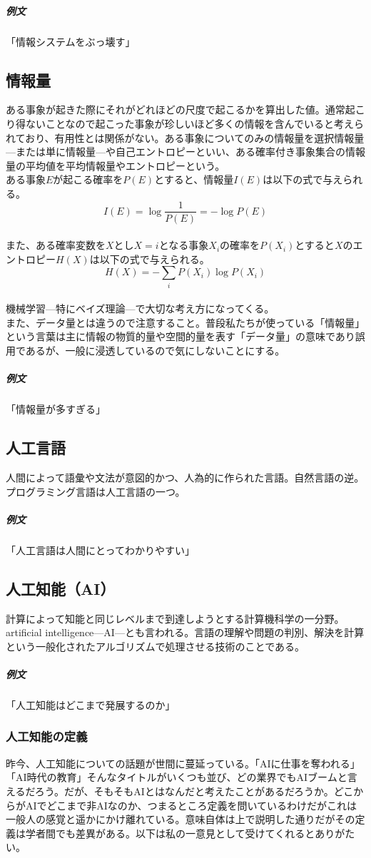 \documentclass[a4paper]{ltjsreport}
\begin{document}
\subparagraph{例文}「情報システムをぶっ壊す」

\subsection{情報量}
ある事象が起きた際にそれがどれほどの尺度で起こるかを算出した値。通常起こり得ないことなので起こった事象が珍しいほど多くの情報を含んでいると考えられており、有用性とは関係がない。ある事象についてのみの情報量を選択情報量---または単に情報量---や自己エントロピーといい、ある確率付き事象集合の情報量の平均値を平均情報量やエントロピーという。
\\

ある事象$E$が起こる確率を$P(E)$とすると、情報量$I(E)$は以下の式で与えられる。\[
  I(E) = \log{\frac{1}{P(E)}} = -\log{P(E)}
\]\\
また、ある確率変数を$X$とし$X=i$となる事象$X_i$の確率を$P(X_i)$とすると$X$のエントロピー$H(X)$は以下の式で与えられる。\[
  H(X) = -\sum_{i} P(X_i) \log{P(X_i)}
\]\\
機械学習---特にベイズ理論---で大切な考え方になってくる。
\\

また、データ量とは違うので注意すること。普段私たちが使っている「情報量」という言葉は主に情報の物質的量や空間的量を表す「データ量」の意味であり誤用であるが、一般に浸透しているので気にしないことにする。

\subparagraph{例文}「情報量が多すぎる」


\subsection{人工言語}
人間によって語彙や文法が意図的かつ、人為的に作られた言語。自然言語の逆。プログラミング言語は人工言語の一つ。

\subparagraph{例文}「人工言語は人間にとってわかりやすい」

\subsection{人工知能（AI）}
計算によって知能と同じレベルまで到達しようとする計算機科学の一分野。artificial intelligence---AI---とも言われる。言語の理解や問題の判別、解決を計算という一般化されたアルゴリズムで処理させる技術のことである。

\subparagraph{例文}「人工知能はどこまで発展するのか」

\subsubsection{人工知能の定義}
昨今、人工知能についての話題が世間に蔓延っている。「AIに仕事を奪われる」「AI時代の教育」そんなタイトルがいくつも並び、どの業界でもAIブームと言えるだろう。だが、そもそもAIとはなんだと考えたことがあるだろうか。どこからがAIでどこまで非AIなのか、つまるところ定義を問いているわけだがこれは一般人の感覚と遥かにかけ離れている。意味自体は上で説明した通りだがその定義は学者間でも差異がある。以下は私の一意見として受けてくれるとありがたい。
\\
\end{document}
